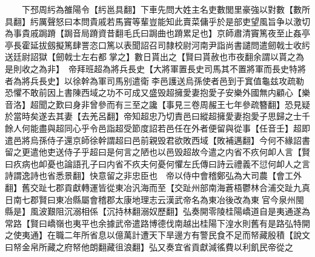 　　下邳周䊸為雒陽令【䊸邕具翻】下車先問大姓主名吏數閭里豪強以對數【數所具翻】䊸厲聲怒曰本問貴戚若馬竇等輩豈能知此賣菜傭乎於是部吏望風旨争以激切為事貴戚跼蹐【跼音局蹐資昔翻毛氏曰跼曲也蹐累足也】京師肅清竇篤夜至止姦亭亭長霍延拔劔擬篤肆詈恣口篤以表聞詔召司隸校尉河南尹詣尚書譴問遣劒戟士收䊸送廷尉詔獄【劒戟士左右都掌之】數日貰出之【賢曰貰赦也市夜翻余謂以貰之為是則收之為非】　帝拜班超為將兵長史【大將軍置長史司馬其不置將軍而長史特將者為將兵長史】以徐幹為軍司馬别遣衛李邑護送烏孫使者邑到于窴值龜兹攻疏勒恐懼不敢前因上書陳西域之功不可成又盛毁超擁愛妻抱愛子安樂外國無内顧心【樂音洛】超聞之歎曰身非曾參而有三至之讒【事見三卷周赧王七年參疏簪翻】恐見疑於當時矣遂去其妻【去羌呂翻】帝知超忠乃切責邑曰縱超擁愛妻抱愛子思歸之士千餘人何能盡與超同心乎令邑詣超受節度詔若邑任在外者便留與從事【任音壬】超即遣邑將烏孫侍子還京師徐幹謂超曰邑前親毁君欲敗西域【敗補邁翻】今何不緣詔書留之更遣他吏送侍子乎超曰是何言之陋也以邑毁超故今遣之内省不疚何卹人言【賢曰疚病也卹憂也論語孔子曰内省不疚夫何憂何懼左氏傳曰詩云禮義不愆何卹人之言詩謂逸詩也省悉景翻】快意留之非忠臣也　帝以侍中會稽鄭弘為大司農【會工外翻】舊交趾七郡貢獻轉運皆從東冶汎海而至【交趾州部南海蒼梧鬱林合浦交趾九真日南七郡賢曰東冶縣屬會稽郡太康地理志云漢武帝名為東冶後改為東官今泉州閩縣是】風波艱阻沉溺相係【沉持林翻溺奴歷翻】弘奏開零陵桂陽嶠道自是夷通遂為常路【賢曰嶠嶺也夷平也余據武帝遣路博德伐南越出桂陽下湟水則舊有是路弘特開之使夷通】在職二年所省息以億萬計遭天下旱邊方有警民食不足而帑藏殷積【說文曰帑金帛所藏之府帑他朗翻藏徂浪翻】弘又奏宜省貢獻減徭費以利飢民帝從之


